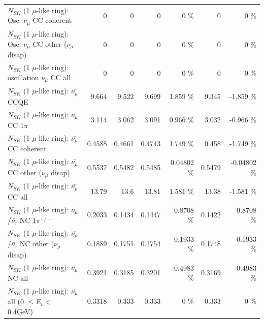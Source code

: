 \begin{table}
\begin{tabular}{| l | r | r | r  r | r  r |}
                        $N_{SK}$ (1 $\mu$-like ring): Osc. $\nu_\mu$ CC coherent &               0 &               0 &               0 &        0 \%  &               0 &        0 \%  \\ 
         $N_{SK}$ (1 $\mu$-like ring): Osc. $\nu_\mu$ CC other ($\nu_\mu$ disap) &               0 &               0 &               0 &        0 \%  &               0 &        0 \%  \\ 
                      $N_{SK}$ (1 $\mu$-like ring): oscillation $\nu_\mu$ CC all &               0 &               0 &               0 &        0 \%  &               0 &        0 \%  \\ 
\hline
\hline
                              $N_{SK}$ (1 $\mu$-like ring): $\bar{\nu_\mu}$ CCQE &           9.664 &           9.522 &           9.699 &    1.859 \%  &           9.345 &   -1.859 \%  \\ 
                         $N_{SK}$ (1 $\mu$-like ring): $\bar{\nu_\mu}$ CC 1$\pi$ &           3.114 &           3.062 &           3.091 &    0.966 \%  &           3.032 &   -0.966 \%  \\ 
                       $N_{SK}$ (1 $\mu$-like ring): $\bar{\nu_\mu}$ CC coherent &          0.4588 &          0.4661 &          0.4743 &    1.749 \%  &           0.458 &   -1.749 \%  \\ 
        $N_{SK}$ (1 $\mu$-like ring): $\bar{\nu_\mu}$ CC other ($\nu_\mu$ disap) &          0.5537 &          0.5482 &          0.5485 &  0.04802 \%  &          0.5479 & -0.04802 \%  \\ 
                          $N_{SK}$ (1 $\mu$-like ring): $\bar{\nu_{\mu}}$ CC all &           13.79 &            13.6 &           13.81 &    1.581 \%  &           13.38 &   -1.581 \%  \\ 
\hline
  $N_{SK}$ (1 $\mu$-like ring): $\bar{\nu_\mu}$/$\bar{\nu_\tau}$ NC 1$\pi^{+/-}$ &          0.2033 &          0.1434 &          0.1447 &   0.8708 \%  &          0.1422 &  -0.8708 \%  \\ 
$N_{SK}$ (1 $\mu$-like ring): $\bar{\nu_\mu}$/$\bar{\nu_\tau}$ NC other ($\nu_\mu$ disap) &          0.1889 &          0.1751 &          0.1754 &   0.1933 \%  &          0.1748 &  -0.1933 \%  \\ 
                          $N_{SK}$ (1 $\mu$-like ring): $\bar{\nu_{\mu}}$ NC all &          0.3921 &          0.3185 &          0.3201 &   0.4983 \%  &          0.3169 &  -0.4983 \%  \\ 
\hline
   $N_{SK}$ (1 $\mu$-like ring): $\bar{\nu_{\mu}}$ all (0 $\leq E_{t} <$ 0.4GeV) &          0.3318 &           0.333 &           0.333 &        0 \%  &           0.333 &        0 \%  \\ 

\end{tabular}
\end{table}
